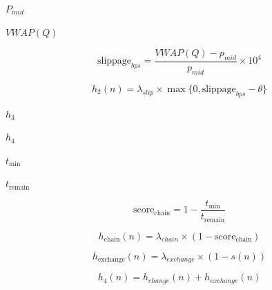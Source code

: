 $P_{mid}$

$VWAP(Q)$

\begin{equation}
    \text{slippage}_{bps} = \frac{VWAP(Q) -p_{mid}}{p_{mid}}\times 10^4
\end{equation}

\begin{equation}
    h_2(n) = \lambda_{slip} \times \max\{0, \text{slippage}_{bps}-\theta \}
\end{equation}

$h_3$

$h_4$

$t_{\min}$

$t_{\text{remain}}$

\begin{equation}
    \text{score}_{\text{chain}} = 1 - \frac{t_{\min}}{t_{\text{remain}}}
\end{equation}

\begin{equation}
    h_{\text{chain}}(n) = \lambda_{chain} \times (1- \text{score}_{\text{chain}})
\end{equation}

\begin{equation}
    h_{\text{exchange}}(n) = \lambda_{exchange} \times (1- s(n))
\end{equation}

\begin{equation}
    h_4(n) = h_{change}(n) + h_{exchange}(n)
\end{equation}